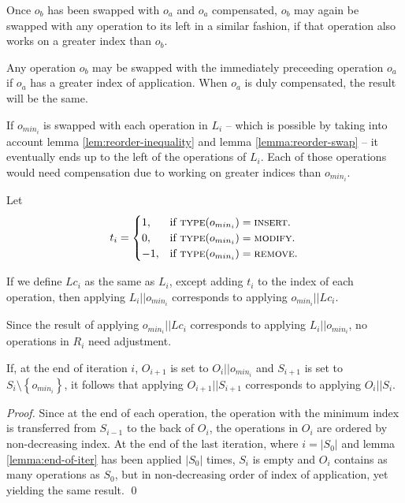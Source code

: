 Once $o_b$ has been swapped with $o_a$ and $o_a$ compensated, $o_b$ may again be
swapped with any operation to its left in a similar fashion, if that operation
also works on a greater index than $o_b$.

\begin{lemma}
\label{lemma:reorder-swap}

Any operation $o_b$ may be swapped with the immediately preceeding operation
$o_a$ if $o_a$ has a greater index of application. When $o_a$ is duly
compensated, the result will be the same.

\end{lemma}

If $o_{min_i}$ is swapped with each operation in $L_i$ -- which is possible by
taking into account lemma \ref{lem:reorder-inequality} and lemma
\ref{lemma:reorder-swap} -- it eventually ends up to the left of the operations
of $L_i$. Each of those operations would need compensation due to working on
greater indices than $o_{min_i}$.

Let
\begin{equation*}
  t_i = 
  \begin{cases}
      1, & \text{if $\textsc{type}(o_{min_i}) = \textsc{insert}$}.\\
      0, & \text{if $\textsc{type}(o_{min_i}) = \textsc{modify}$}.\\
      -1, & \text{if $\textsc{type}(o_{min_i}) = \textsc{remove}$}.
  \end{cases}
\end{equation*}

If we define $Lc_i$ as the same as $L_i$, except adding $t_i$ to the index of
each operation, then applying $L_i || o_{min_i}$ corresponds to applying
$o_{min_i} || Lc_i$.

Since the result of applying $o_{min_i} || Lc_i$ corresponds to applying
$L_i || o_{min_i}$, no operations in $R_i$ need adjustment.

\begin{lemma}
\label{lemma:end-of-iter}

If, at the end of iteration $i$, $O_{i+1}$ is set to $O_i || o_{min_i}$ and
$S_{i+1}$ is set to $S_i \setminus \left\{o_{min_i}\right\}$, it follows that
applying $O_{i+1} || S_{i+1}$ corresponds to applying $O_i || S_i$.

\end{lemma}

\begin{proof}

Since at the end of each operation, the operation with the minimum index is
transferred from $S_{i-1}$ to the back of $O_i$, the operations in $O_i$ are
ordered by non-decreasing index. At the end of the last iteration, where
$i=\left|S_0\right|$ and lemma \ref{lemma:end-of-iter} has been applied
$\left|S_0\right|$ times, $S_i$ is empty and $O_i$ contains as many operations
as $S_0$, but in non-decreasing order of index of application, yet yielding the
same result. \qed

\end{proof}


